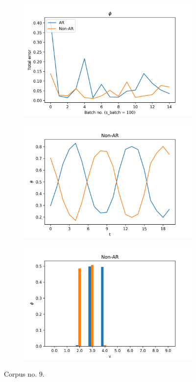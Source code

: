 \documentclass[12pt]{article}
\begin{document}
\begin{figure}[H]
  \begin{subfigure}[b]{0.3\textwidth}
    \includegraphics[width=\linewidth]{performance_phis_experiment-1|overlapping-yes_dataset-9.png}
  \end{subfigure}%
  \begin{subfigure}[b]{0.3\textwidth}
    \includegraphics[width=\linewidth]{latent_thetas_Non-AR_experiment-1|overlapping-yes_dataset-9.png}
  \end{subfigure}%
  \begin{subfigure}[b]{0.3\textwidth}
    \includegraphics[width=\linewidth]{latent_phis_Non-AR_experiment-1|overlapping-yes_dataset-9.png}
  \end{subfigure}%
  \caption{Corpus no. $9$.}


\end{figure}
\end{document}
